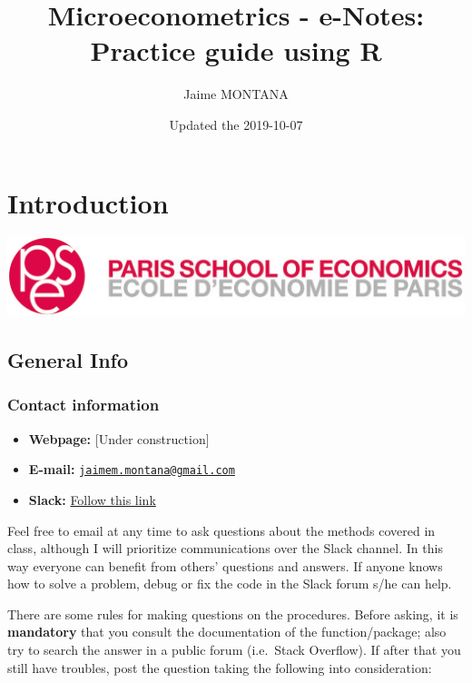 \documentclass[]{book}
\title{Microeconometrics - e-Notes: Practice guide using R}
\author{Jaime MONTANA}
\date{Updated the 2019-10-07}
\providecommand{\tightlist}{%
  \setlength{\itemsep}{0pt}\setlength{\parskip}{0pt}}
\begin{document}
\maketitle

{
\setcounter{tocdepth}{1}
\tableofcontents
}
\chapter{Introduction}\label{introduction}

\begin{center}\includegraphics[width=0.9\linewidth]{./images/1200px-Logo_pse_petit} \end{center}

\section{General Info}\label{general-info}

\subsection{Contact information}\label{contact-information}

\begin{itemize}
\tightlist
\item
  \textbf{Webpage:} {[}Under construction{]}
\item
  \textbf{E-mail:}
  \href{mailto:jaimem.montana@gmail.com}{\nolinkurl{jaimem.montana@gmail.com}}
\item
  \textbf{Slack:}
  \href{https://join.slack.com/t/psemicecometrics19/shared_invite/enQtNzY4NTYyMTM2MTMzLTM5ZmVmNTRjYTg3NzVkZTg4YzQzNjU3OTllZTFkODJjYzA0MWE0MTZkOTFlZmZhODhiMmViZWNlYzRiZWI1ZjU}{Follow
  this link}
\end{itemize}

Feel free to email at any time to ask questions about the methods
covered in class, although I will prioritize communications over the
Slack channel. In this way everyone can benefit from others' questions
and answers. If anyone knows how to solve a problem, debug or fix the
code in the Slack forum s/he can help.

There are some rules for making questions on the procedures. Before
asking, it is \textbf{mandatory} that you consult the documentation of
the function/package; also try to search the answer in a public forum
(i.e.~Stack Overflow). If after that you still have troubles, post the
question taking the following into consideration:
\end{document}
